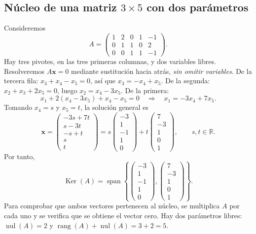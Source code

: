 \documentclass[12pt]{article}
\theoremstyle{remark}
\newcommand{\R}{\mathbb{R}}
\newcommand{\rang}{\operatorname{rang}}
\newcommand{\nul}{\operatorname{nul}}
\newcommand{\Ker}{\operatorname{Ker}}
\newcommand{\vect}[1]{\boldsymbol{#1}}
\begin{document}
\subsection*{Núcleo de una matriz $3\times5$ con dos parámetros}
Consideremos
\[
A=\begin{pmatrix}1&2&0&1&-1\\0&1&1&0&2\\0&0&1&1&-1\end{pmatrix}.
\]
Hay tres pivotes, en las tres primeras columnas, y dos variables libres. Resolveremos $A\vect x=0$ mediante sustitución hacia atrás, \emph{sin omitir variables}.
De la tercera fila: $x_3+x_4-x_5=0$, así que $x_3=-x_4+x_5$. De la segunda: $x_2+x_3+2x_5=0$, luego $x_2=x_4-3x_5$. De la primera:
\[
x_1+2(x_4-3x_5)+x_4-x_5=0\quad\Longrightarrow\quad x_1=-3x_4+7x_5.
\]
Tomando $x_4=s$ y $x_5=t$, la solución general es
\[
\vect x=\begin{pmatrix}-3s+7t\\s-3t\\-s+t\\s\\t\end{pmatrix}
=s\begin{pmatrix}-3\\1\\-1\\1\\0\end{pmatrix}
+t\begin{pmatrix}7\\-3\\1\\0\\1\end{pmatrix},\qquad s,t\in\R.
\]
Por tanto,
\[
\boxed{\Ker(A)=\operatorname{span}\left\{
\begin{pmatrix}-3\\1\\-1\\1\\0\end{pmatrix},
\begin{pmatrix}7\\-3\\1\\0\\1\end{pmatrix}\right\}.}
\]
Para comprobar que ambos vectores pertenecen al núcleo, se multiplica $A$ por cada uno y se verifica que se obtiene el vector cero. Hay dos parámetros libres: $\nul(A)=2$ y $\rang(A)+\nul(A)=3+2=5$.
\end{document}
